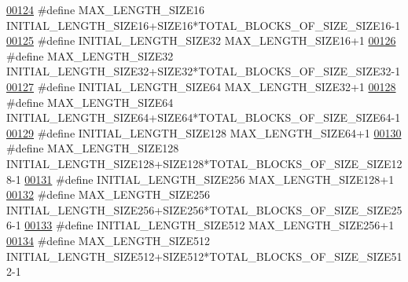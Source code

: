 \begin{DoxyCode}
{\hypertarget{memory_management_8h_source_l00124}{}\hyperlink{memory_management_8h_aec5f54b4ff5ea97b1bb298318f9bef2b}{00124} \textcolor{preprocessor}{#define MAX\_LENGTH\_SIZE16                 INITIAL\_LENGTH\_SIZE16+SIZE16*TOTAL\_BLOCKS\_OF\_SIZE\_SIZE16-1}
\hypertarget{memory_management_8h_source_l00125}{}\hyperlink{memory_management_8h_ac7eb7c350e8e057898c62a31083863dd}{00125} \textcolor{preprocessor}{#define INITIAL\_LENGTH\_SIZE32             MAX\_LENGTH\_SIZE16+1}
\hypertarget{memory_management_8h_source_l00126}{}\hyperlink{memory_management_8h_ac309e3185598c14710f7e86e9a8d7eac}{00126} \textcolor{preprocessor}{#define MAX\_LENGTH\_SIZE32                 INITIAL\_LENGTH\_SIZE32+SIZE32*TOTAL\_BLOCKS\_OF\_SIZE\_SIZE32-1}
\hypertarget{memory_management_8h_source_l00127}{}\hyperlink{memory_management_8h_a56fa454329b11df943953c4f665e1e7b}{00127} \textcolor{preprocessor}{#define INITIAL\_LENGTH\_SIZE64             MAX\_LENGTH\_SIZE32+1}
\hypertarget{memory_management_8h_source_l00128}{}\hyperlink{memory_management_8h_a994f4c90c9aa7d6901408d390a58a461}{00128} \textcolor{preprocessor}{#define MAX\_LENGTH\_SIZE64                 INITIAL\_LENGTH\_SIZE64+SIZE64*TOTAL\_BLOCKS\_OF\_SIZE\_SIZE64-1}
\hypertarget{memory_management_8h_source_l00129}{}\hyperlink{memory_management_8h_aca91788276caef0abea30327b94a91a3}{00129} \textcolor{preprocessor}{#define INITIAL\_LENGTH\_SIZE128            MAX\_LENGTH\_SIZE64+1}
\hypertarget{memory_management_8h_source_l00130}{}\hyperlink{memory_management_8h_a1495561797b4fc61bbbb796b5cfea87c}{00130} \textcolor{preprocessor}{#define MAX\_LENGTH\_SIZE128                INITIAL\_LENGTH\_SIZE128+SIZE128*TOTAL\_BLOCKS\_OF\_SIZE\_SIZE128-1}
\hypertarget{memory_management_8h_source_l00131}{}\hyperlink{memory_management_8h_a90688b443518c2111772b264985c78b7}{00131} \textcolor{preprocessor}{#define INITIAL\_LENGTH\_SIZE256            MAX\_LENGTH\_SIZE128+1}
\hypertarget{memory_management_8h_source_l00132}{}\hyperlink{memory_management_8h_a6af89ae77a299e48140b132936410d92}{00132} \textcolor{preprocessor}{#define MAX\_LENGTH\_SIZE256                INITIAL\_LENGTH\_SIZE256+SIZE256*TOTAL\_BLOCKS\_OF\_SIZE\_SIZE256-1}
\hypertarget{memory_management_8h_source_l00133}{}\hyperlink{memory_management_8h_a7ee9ee9208e5d413960d0197756b86f1}{00133} \textcolor{preprocessor}{#define INITIAL\_LENGTH\_SIZE512            MAX\_LENGTH\_SIZE256+1}
\hypertarget{memory_management_8h_source_l00134}{}\hyperlink{memory_management_8h_a584ba52d3a0818ea3c54119df40d1b56}{00134} \textcolor{preprocessor}{#define MAX\_LENGTH\_SIZE512                INITIAL\_LENGTH\_SIZE512+SIZE512*TOTAL\_BLOCKS\_OF\_SIZE\_SIZE512-1}
}
\end{DoxyCode}
